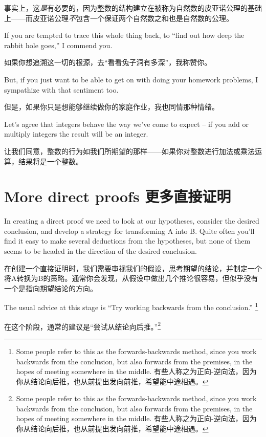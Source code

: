 事实上，这{\em 是}有必要的，因为整数的结构建立在被称为自然数的皮亚诺公理的基础上——而皮亚诺公理{\em 不}包含一个保证两个自然数之和也是自然数的公理。

If you
are tempted to trace this whole thing back, to ``find out how deep the rabbit hole goes,'' I commend
you.

如果你想追溯这一切的根源，去“看看兔子洞有多深”，我称赞你。

But, if you just want to be able to get on with doing your homework problems, I sympathize 
with that sentiment too.

但是，如果你只是想能够继续做你的家庭作业，我也同情那种情绪。

Let's agree that integers behave the way we've come to expect -- if 
you add or multiply integers the result will be an integer.

让我们同意，整数的行为如我们所期望的那样——如果你对整数进行加法或乘法运算，结果将是一个整数。

\newpage




\newpage


\section{More direct proofs 更多直接证明}
\label{sec:more}

In creating a direct proof we need to look at our hypotheses, consider 
the desired conclusion, and develop a strategy for transforming A into B.
Quite often you'll find it easy to make several deductions from the 
hypotheses, but none of them seems to be headed in the direction of 
the desired conclusion.

在创建一个直接证明时，我们需要审视我们的假设，思考期望的结论，并制定一个将A转换为B的策略。通常你会发现，从假设中做出几个推论很容易，但似乎没有一个是指向期望结论的方向。

The usual advice at this stage is 
``Try working backwards from the conclusion.''
\footnote{Some people refer to this as the forwards-backwards method, since %
you work backwards from the conclusion, but also forwards from the premises, %
in the hopes of meeting somewhere in the middle. 有些人称之为正向-逆向法，因为你从结论向后推，也从前提出发向前推，希望能中途相遇。}  

在这个阶段，通常的建议是“尝试从结论向后推。”\footnote{Some people refer to this as the forwards-backwards method, since %
you work backwards from the conclusion, but also forwards from the premises, %
in the hopes of meeting somewhere in the middle. 有些人称之为正向-逆向法，因为你从结论向后推，也从前提出发向前推，希望能中途相遇。}

